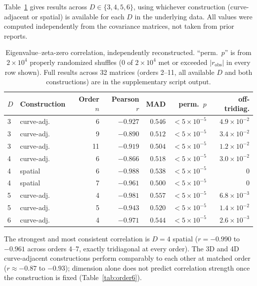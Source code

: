 \documentclass[11pt,a4paper]{article}
\begin{document}
Table~\ref{tab:correlation} gives results across $D\in\{3,4,5,6\}$, using
whichever construction (curve-adjacent or spatial) is available for each
$D$ in the underlying data. All values were computed independently
from the covariance matrices, not taken from prior reports.

\begin{table}[h]
\centering
\small
\begin{tabular}{llrrrrr}
\toprule
$D$ & Construction & Order $n$ & Pearson $r$ & MAD & perm.\ $p$ & off-tridiag.\\
\midrule
3 & curve-adj. & 6  & $-0.927$ & $0.546$ & $<5\times10^{-5}$ & $4.9\times10^{-2}$\\
3 & curve-adj. & 9  & $-0.890$ & $0.512$ & $<5\times10^{-5}$ & $3.4\times10^{-2}$\\
3 & curve-adj. & 11 & $-0.919$ & $0.504$ & $<5\times10^{-5}$ & $1.2\times10^{-2}$\\
4 & curve-adj. & 6  & $-0.866$ & $0.518$ & $<5\times10^{-5}$ & $3.0\times10^{-2}$\\
4 & spatial    & 6  & $-0.988$ & $0.538$ & $<5\times10^{-5}$ & $0$\\
4 & spatial    & 7  & $-0.961$ & $0.500$ & $<5\times10^{-5}$ & $0$\\
5 & curve-adj. & 4  & $-0.981$ & $0.557$ & $<5\times10^{-5}$ & $6.8\times10^{-3}$\\
5 & curve-adj. & 5  & $-0.943$ & $0.520$ & $<5\times10^{-5}$ & $1.4\times10^{-2}$\\
6 & curve-adj. & 4  & $-0.971$ & $0.544$ & $<5\times10^{-5}$ & $2.6\times10^{-3}$\\
\bottomrule
\end{tabular}
\caption{Eigenvalue--zeta-zero correlation, independently reconstructed.
``perm.\ $p$'' is from $2\times10^4$ properly randomized shuffles (0 of
$2\times10^4$ met or exceeded $|r_{\mathrm{obs}}|$ in every row shown).
Full results across 32 matrices (orders 2--11, all available $D$ and both
constructions) are in the supplementary script output.}
\label{tab:correlation}
\end{table}

The strongest and most consistent correlation is $D=4$ spatial
($r=-0.990$ to $-0.961$ across orders 4--7, exactly tridiagonal at every
order). The 3D and 4D curve-adjacent constructions perform comparably to
each other at matched order ($r\approx -0.87$ to $-0.93$); dimension alone
does not predict correlation strength once the construction is fixed
(Table~\ref{tab:order6}).
\end{document}
